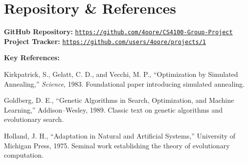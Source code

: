 \documentclass[11pt, letterpaper]{article}
\begin{document}
\section{Repository \& References}
\begin{tcolorbox}[sectionbox, height=4.5cm, valign=top]
  \textbf{GitHub Repository:}
  \href{https://github.com/4oore/CS4100-Group-Project}%
       {\texttt{https://github.com/4oore/CS4100-Group-Project}}\\

  \textbf{Project Tracker:} \href{https://github.com/users/4oore/projects/1}{\texttt{https://github.com/users/4oore/projects/1}}

  \vspace{6pt}
  \textbf{Key References:}
  \begin{enumerate}[leftmargin=1.4em, itemsep=1pt, topsep=2pt, label={[\arabic*]}]
    \item Kirkpatrick, S., Gelatt, C. D., and Vecchi, M. P., ``Optimization by Simulated Annealing,'' \textit{Science}, 1983. Foundational paper introducing simulated annealing.
    \item Goldberg, D. E., ``Genetic Algorithms in Search, Optimization, and Machine Learning,'' Addison–Wesley, 1989. Classic text on genetic algorithms and evolutionary search.
    \item Holland, J. H., ``Adaptation in Natural and Artificial Systems,'' University of Michigan Press, 1975. Seminal work establishing the theory of evolutionary computation.
  \end{enumerate}

  \vspace{4pt}
\end{tcolorbox}
\end{document}
